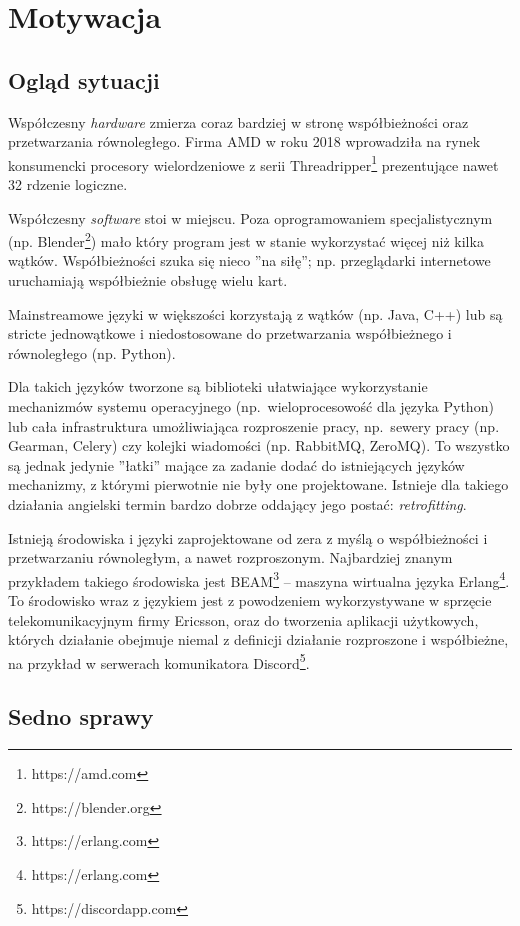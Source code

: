 \documentclass[11pt,oneside,a4paper,titlepage,onecolumn]{book}
\begin{document}
\section{Motywacja}

\subsection{Ogląd sytuacji}

Współczesny \emph{hardware} zmierza coraz bardziej w stronę współbieżności oraz przetwarzania równoległego.
Firma AMD w roku 2018 wprowadziła na rynek konsumencki procesory wielordzeniowe z serii
Threadripper\footnote{https://amd.com} prezentujące nawet 32 rdzenie logiczne.

Współczesny \emph{software} stoi w miejscu. Poza oprogramowaniem specjalistycznym (np.
Blender\footnote{https://blender.org}) mało który program jest w stanie wykorzystać więcej niż kilka wątków.
Współbieżności szuka się nieco ''na siłę''; np. przeglądarki internetowe uruchamiają współbieżnie obsługę
wielu kart.

Mainstreamowe języki w większości korzystają z wątków (np. Java, C++) lub są stricte jednowątkowe i
niedostosowane do przetwarzania współbieżnego i równoległego (np. Python).

Dla takich języków tworzone są biblioteki ułatwiające wykorzystanie mechanizmów systemu operacyjnego
(np.~wieloprocesowość dla języka Python) lub cała infrastruktura umożliwiająca rozproszenie pracy,
np.~sewery pracy (np. Gearman, Celery) czy kolejki wiadomości (np. RabbitMQ, ZeroMQ).
To wszystko są jednak jedynie ''łatki'' mające za zadanie dodać do istniejących języków mechanizmy, z którymi
pierwotnie nie były one projektowane. Istnieje dla takiego działania angielski termin bardzo dobrze oddający
jego postać: \emph{retrofitting}.

Istnieją środowiska i języki zaprojektowane od zera z myślą o współbieżności i przetwarzaniu równoległym, a
nawet rozproszonym.
Najbardziej znanym przykładem takiego środowiska jest BEAM\footnote{https://erlang.com} -- maszyna wirtualna
języka Erlang\footnote{https://erlang.com}. To środowisko wraz z językiem jest z powodzeniem wykorzystywane w
sprzęcie telekomunikacyjnym firmy Ericsson, oraz do tworzenia aplikacji użytkowych, których działanie obejmuje
niemal z definicji działanie rozproszone i współbieżne, na przykład w serwerach komunikatora
Discord\footnote{https://discordapp.com}.

\subsection{Sedno sprawy}
\end{document}
